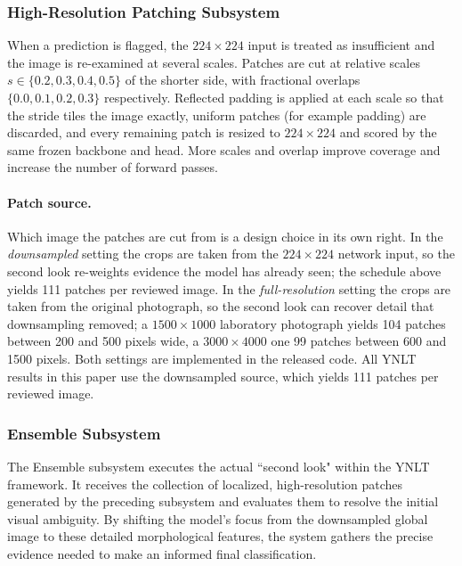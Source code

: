 \documentclass[final,3p,times,twocolumn]{elsarticle}
\begin{document}
\subsubsection{High-Resolution Patching Subsystem}
\label{subsec:patching}

When a prediction is flagged, the $224\times 224$ input is treated as insufficient and the image is re-examined at several scales. Patches are cut at relative scales \(s \in \{0.2, 0.3, 0.4, 0.5\}\) of the shorter side, with fractional overlaps \(\{0.0, 0.1, 0.2, 0.3\}\) respectively. Reflected padding is applied at each scale so that the stride tiles the image exactly, uniform patches (for example padding) are discarded, and every remaining patch is resized to $224\times 224$ and scored by the same frozen backbone and head. More scales and overlap improve coverage and increase the number of forward passes.

\paragraph{Patch source.} Which image the patches are cut from is a design choice in its own right. In the \emph{downsampled} setting the crops are taken from the $224\times 224$ network input, so the second look re-weights evidence the model has already seen; the schedule above yields 111 patches per reviewed image. In the \emph{full-resolution} setting the crops are taken from the original photograph, so the second look can recover detail that downsampling removed; a $1500\times 1000$ laboratory photograph yields 104 patches between 200 and 500 pixels wide, a $3000\times 4000$ one 99 patches between 600 and 1500 pixels. Both settings are implemented in the released code. All YNLT results in this paper use the downsampled source, which yields 111 patches per reviewed image.

\subsubsection{Ensemble Subsystem}

The Ensemble subsystem executes the actual ``second look" within the YNLT framework. It receives the collection of localized, high-resolution patches generated by the preceding subsystem and evaluates them to resolve the initial visual ambiguity. By shifting the model's focus from the downsampled global image to these detailed morphological features, the system gathers the precise evidence needed to make an informed final classification.
\end{document}
